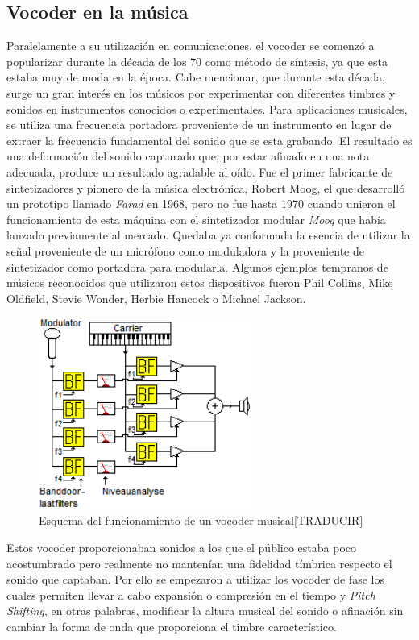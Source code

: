 \subsection{Vocoder en la música}
Paralelamente a su utilización en comunicaciones, el vocoder se comenzó a popularizar durante la década de los 70 como método de síntesis, ya que esta estaba muy de moda en la época. Cabe mencionar, que durante esta década, surge un gran interés en los músicos por experimentar con diferentes timbres y sonidos en instrumentos conocidos o experimentales. Para aplicaciones musicales, se utiliza una frecuencia portadora proveniente de un instrumento en lugar de extraer la frecuencia fundamental del sonido que se esta grabando. El resultado es una deformación del sonido capturado que, por estar afinado en una nota adecuada, produce un resultado agradable al oído. Fue el primer fabricante de sintetizadores y pionero de la música electrónica, Robert Moog, el que desarrolló un prototipo llamado \emph{Farad} en 1968, pero no fue hasta 1970 cuando unieron el funcionamiento de esta máquina con el sintetizador modular \emph{Moog} que había lanzado previamente al mercado. Quedaba ya conformada la esencia de utilizar la señal proveniente de un micrófono como moduladora y la proveniente de sintetizador como portadora para modularla. Algunos ejemplos tempranos de músicos reconocidos que utilizaron estos dispositivos fueron Phil Collins, Mike Oldfield, Stevie Wonder, Herbie Hancock o Michael Jackson.

\begin{figure}
\begin{center}
\includegraphics[width=7cm]{img/music_vocoder.png}
\caption{Esquema del funcionamiento de un vocoder musical[TRADUCIR]}
\end{center}
\end{figure}

Estos vocoder proporcionaban sonidos a los que el público estaba poco acostumbrado pero realmente no mantenían una fidelidad tímbrica respecto el sonido que captaban. Por ello se empezaron a utilizar los vocoder de fase los cuales permiten llevar a cabo expansión o compresión en el tiempo y \emph{Pitch Shifting}, en otras palabras, modificar la altura musical del sonido o afinación sin cambiar la forma de onda que proporciona el timbre característico.

